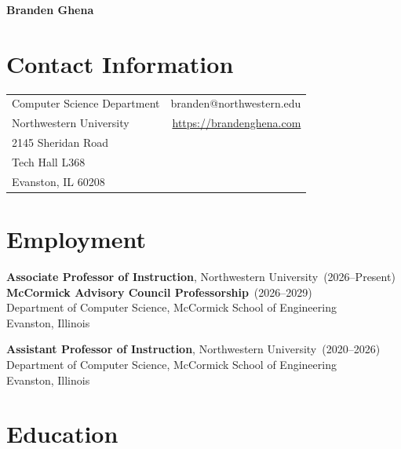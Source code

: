 \documentclass{article}
\begin{document}

\nocite{*}

\begin{center}
    \Huge{\bf{Branden Ghena}} \\
\end{center}

\section*{Contact Information}

\begin{table}[H]
\centering
\vspace*{-16pt}
\begin{tabularx}{\linewidth}{@{} X r @{}}
    {Computer Science Department}     & {branden@northwestern.edu} \\
    {Northwestern University}   & \url{https://brandenghena.com} \\
    {2145 Sheridan Road} & {} \\
    {Tech Hall L368} & {} \\
    {Evanston, IL 60208} & {} \\
\end{tabularx}
\end{table}

\section*{Employment}
\vspace{-6pt}

{\bf Associate Professor of Instruction}, Northwestern University~(2026--Present) \\
{\bf McCormick Advisory Council Professorship}~(2026--2029) \\
Department of Computer Science, McCormick School of Engineering \\
Evanston, Illinois

{\bf Assistant Professor of Instruction}, Northwestern University~(2020--2026) \\
Department of Computer Science, McCormick School of Engineering \\
Evanston, Illinois


\section*{Education}
\vspace{-6pt}
\end{document}
